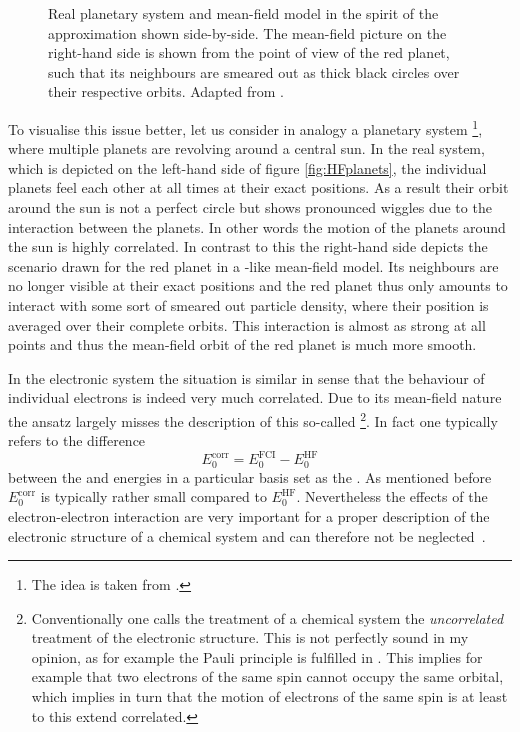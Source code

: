 \begin{figure}
	\centering
	\caption[Real planetary system and mean-field model of it shown side-by-side]{
		Real planetary system and mean-field model
		in the spirit of the \HF approximation
		shown side-by-side.
		The mean-field picture on the right-hand side
		is shown from the point of view of the red planet,
		such that its neighbours are smeared out as thick black
		circles over their respective orbits.
		Adapted from \cite{Jensen2007book}.
	}
	\label{fig:HFplanets}
\end{figure}
To visualise this issue better,
let us consider in analogy a planetary system%
\footnote{The idea is taken from \cite{Jensen2007book}.},
where multiple planets are revolving around a central sun.
In the real system,
which is depicted on the left-hand side of figure \vref{fig:HFplanets},
the individual planets feel each other at all times
at their exact positions.
As a result their orbit around the sun is not a perfect circle but shows pronounced
wiggles due to the interaction between the planets.
In other words the motion of the planets around the sun is highly correlated.
In contrast to this the right-hand side
depicts the scenario drawn for the red planet in a \HF-like mean-field model.
Its neighbours are no longer visible at their exact positions
and the red planet thus only amounts to interact with
some sort of smeared out particle density,
where their position is averaged over their complete orbits.
This interaction is almost as strong at all points
and thus the mean-field orbit of the red planet is much more smooth.

In the electronic system the situation is similar
in sense that the behaviour of individual electrons is indeed very much correlated.
Due to its mean-field nature the \HF ansatz
largely misses the description of this so-called %
\footnote{%
	Conventionally one calls the \HF treatment of a chemical system
	the \emph{uncorrelated} treatment of the electronic structure.
	This is not perfectly sound in my opinion,
	as for example the Pauli principle is fulfilled in \HF.
	This implies for example that two electrons of the same spin
	cannot occupy the same orbital,
	which implies in turn that the motion
	of electrons of the same spin is at least to this extend correlated.
}.
In fact one typically refers to the difference
\begin{equation}
	E_0^{\text{corr}} = E_0^{\text{FCI}} - E_0^{\text{HF}}
	\label{eqn:EnergyCorrelation}
\end{equation}
between the \HF and \FCI energies in a particular basis set
as the .
As mentioned before $E_0^{\text{corr}}$ is typically rather small
compared to $E_0^{\text{HF}}$.
Nevertheless the effects of the electron-electron interaction are very important
for a proper description of the electronic structure of a chemical
system and can therefore not be
neglected~\cite{Helgaker2013,Szabo1996,Jensen2007book}.


